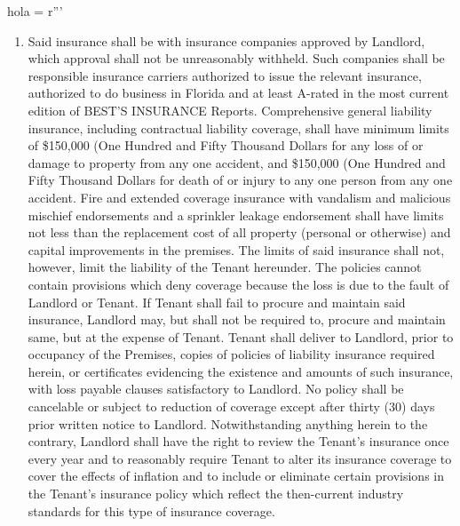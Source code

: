 hola = r'''\documentclass{article}
\newcommand{\liabilityinsurance}{\$150,000 (One Hundred and Fifty Thousand Dollars}
\newcommand{\propertyinsurance}{\$150,000 (One Hundred and Fifty Thousand Dollars}
\begin{document}
\begin{enumerate}
    \item	Said insurance shall be with insurance companies approved by Landlord, which approval shall not be unreasonably withheld. Such companies shall be responsible insurance carriers authorized to issue the relevant insurance, authorized to do business in Florida and at least A-rated in the most current edition of BEST'S INSURANCE Reports. Comprehensive general liability insurance, including contractual liability coverage, shall have minimum limits of \propertyinsurance{} for any loss of or damage to property from any one accident, and \liabilityinsurance{} for death of or injury to any one person from any one accident. Fire and extended coverage insurance with vandalism and malicious mischief endorsements and a sprinkler leakage endorsement shall have limits not less than the replacement cost of all property (personal or otherwise) and capital improvements in the premises. The limits of said insurance shall not, however, limit the liability of the Tenant hereunder. The policies cannot contain provisions which deny coverage because the loss is due to the fault of Landlord or Tenant. If Tenant shall fail to procure and maintain said insurance, Landlord may, but shall not be required to, procure and maintain same, but at the expense of Tenant.  Tenant shall deliver to Landlord, prior to occupancy of the Premises, copies of policies of liability insurance required herein, or certificates evidencing the existence and amounts of such insurance, with loss payable clauses satisfactory to Landlord. No policy shall be cancelable or subject to reduction of coverage except after thirty (30) days prior written notice to Landlord. Notwithstanding anything herein to the contrary, Landlord shall have the right to review the Tenant's insurance once every year and to reasonably require Tenant to alter its insurance coverage to cover the effects of inflation and to include or eliminate certain provisions in the Tenant's insurance policy which reflect the then-current industry standards for this type of insurance coverage.
    \end{enumerate}
\end{document}
